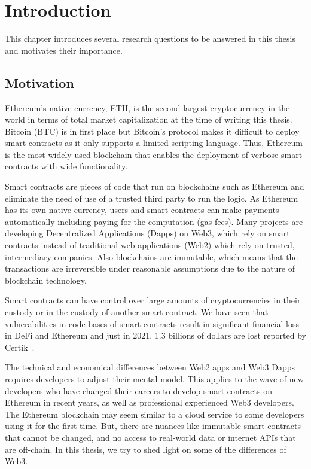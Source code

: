 \chapter{Introduction}

This chapter introduces several research questions to be answered in this thesis and motivates their importance. 

\section{Motivation}
Ethereum's native currency, ETH, is the second-largest cryptocurrency in the world in terms of total market capitalization at the time of writing this thesis. Bitcoin (BTC) is in first place but Bitcoin's protocol makes it difficult to deploy smart contracts as it only supports a limited scripting language. Thus, Ethereum is the most widely used blockchain that enables the deployment of verbose smart contracts with wide functionality. 

Smart contracts are pieces of code that run on blockchains such as Ethereum and eliminate the need of use of a trusted third party to run the logic. As Ethereum has its own native currency, users and smart contracts can make payments automatically including paying for the computation (gas fees).
Many projects are developing Decentralized Applications (Dapps) on Web3, which rely on smart contracts instead of traditional web applications (Web2) which rely on trusted, intermediary companies.
Also blockchains are immutable, which means that the transactions are irreversible under reasonable assumptions due to the nature of blockchain technology. 

Smart contracts can have control over large amounts of cryptocurrencies in their custody or in the custody of another smart contract. We have seen that vulnerabilities in code bases of smart contracts result in significant financial loss in DeFi and Ethereum and just in 2021, 1.3 billions of dollars are lost reported by Certik~\cite{certikReport}.

The technical and economical differences between Web2 apps and Web3 Dapps requires developers to adjust their mental model. This applies to the wave of new developers who have changed their careers to develop smart contracts on Ethereum in recent years, as well as professional experienced Web3 developers. The Ethereum blockchain may seem similar to a cloud service to some developers using it for the first time. But, there are nuances like immutable smart contracts that cannot be changed, and no access to real-world data or internet APIs that are off-chain. In this thesis, we try to shed light on some of the differences of Web3.


